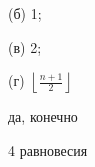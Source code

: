 \begin{solution}{4.6}
(б) 1;

(в) 2;

(г) $\left\lfloor  \frac{n+1}{2} \right\rfloor$
\end{solution}
\begin{solution}{4.7}

\end{solution}
\begin{solution}{4.8}

\end{solution}
\begin{solution}{4.9}

\end{solution}
\begin{solution}{4.10}
да, конечно
\end{solution}
\begin{solution}{4.11}

\end{solution}
\begin{solution}{4.12}

\end{solution}
\begin{solution}{4.13}

\end{solution}
\begin{solution}{4.14}

\end{solution}
\begin{solution}{4.15}
\end{solution}
\begin{solution}{4.16}
\end{solution}
\begin{solution}{4.17}
4 равновесия
\end{solution}
\begin{solution}{4.18}

\end{solution}
\begin{solution}{4.19}

\end{solution}
\begin{solution}{4.20}

\end{solution}
\begin{solution}{4.21}

\end{solution}
\begin{solution}{4.22}

\end{solution}
